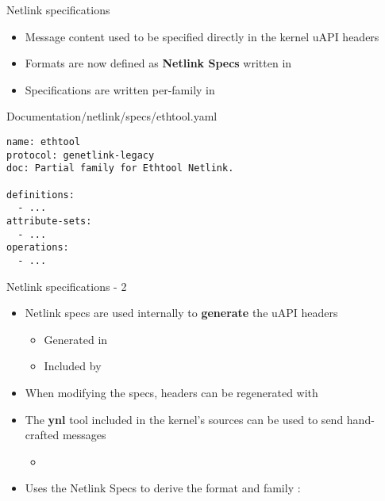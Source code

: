 \begin{frame}[fragile]{Netlink specifications}
	\begin{itemize}
		\item Message content used to be specified directly in the kernel uAPI headers
		\item Formats are now defined as \textbf{Netlink Specs} written in 
		\item Specifications are written per-family in 
	\end{itemize}
	\begin{block}{Documentation/netlink/specs/ethtool.yaml}
	\begin{verbatim}
name: ethtool
protocol: genetlink-legacy
doc: Partial family for Ethtool Netlink.

definitions:
  - ...
attribute-sets:
  - ...
operations:
  - ...
	\end{verbatim}
	\end{block}
\end{frame}

\begin{frame}{Netlink specifications - 2}
	\begin{itemize}
		\item Netlink specs are used internally to \textbf{generate} the uAPI headers
			\begin{itemize}
				\item Generated in 
				\item Included by 
			\end{itemize}
		\item When modifying the specs, headers can be regenerated with 
		\item The \textbf{ynl} tool included in the kernel's sources can be used to send hand-crafted messages
			\begin{itemize}
				\item {}
			\end{itemize}
		\item Uses the Netlink Specs to derive the format and family :
	\end{itemize}
\end{frame}

